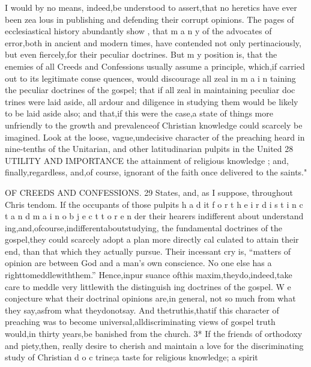 \documentclass[
]{book}
\begin{document}
I would by no means, indeed,be understood to assert,that no heretics have ever been zea lous in publishing and defending their corrupt opinions. The pages of ecclesiastical history abundantly show , that m a n y of the advocates of error,both in ancient and modern times, have contended not only pertinaciously, but even fiercely,for their peculiar doctrines. But m y position is, that the enemies of all Creeds and Confessions usually assume a principle, which,if carried out to its legitimate conse quences, would discourage all zeal in m a i n
taining the peculiar doctrines of the gospel; that if all zeal in maintaining peculiar doc trines were laid aside, all ardour and diligence
in studying them would be likely to be laid aside also; and that,if this were the case,a
state of things more unfriendly to the growth and prevalenceof Christian knowledge could scarcely be imagined. Look at the loose, vague,undecisive character of the preaching heard in nine-tenths of the Unitarian, and
other latitudinarian pulpits in the United
28 UTILITY AND IMPORTANCE
the attainment of religious knowledge ; and, finally,regardless, and,of course, ignorant of
the faith once delivered to the saints."

OF CREEDS AND CONFESSIONS. 29
States, and, as I suppose, throughout Chris tendom. If the occupants of those pulpits h a d it f o r t h e i r d i s t i n c t a n d m a i n o b j e c t t o r e n der their hearers indifferent about understand
ing,and,ofcourse,indifferentaboutstudying, the fundamental doctrines of the gospel,they
could scarcely adopt a plan more directly cal
culated to attain their end, than that which
they actually pursue. Their incessant cry is,
``matters of opinion are between God and a man's own conscience. No one else has a
righttomeddlewiththem.'' Hence,inpur
suance ofthis maxim,theydo,indeed,take
care to meddle very littlewith the distinguish
ing doctrines of the gospel. W e conjecture what their doctrinal opinions are,in general,
not so much from what they say,asfrom what theydonotsay. And thetruthis,thatif
this character of preaching was to become universal,alldiscriminating views of gospel truth would,in thirty years,be banished from the church.
3*
If the friends of orthodoxy and piety,then, really desire to cherish and maintain a love for the discriminating study of Christian d o c trine;a taste for religious knowledge; a spirit
\end{document}
